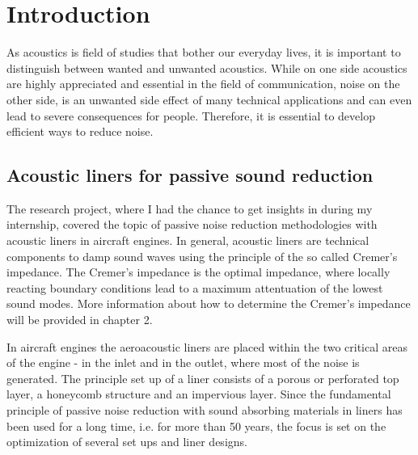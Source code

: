 \documentclass[11pt]{report} %
\begin{document}
\chapter{Introduction} 
As acoustics is field of studies that bother our everyday lives, it is important to distinguish between wanted and unwanted acoustics.
While on one side acoustics are highly appreciated and essential in the field of communication, noise on the other side, is an unwanted side effect of many technical applications and can even lead to severe consequences for people.
Therefore, it is essential to develop efficient ways to reduce noise.

\section{Acoustic liners for passive sound reduction}
The research project, where I had the chance to get insights in during my internship, covered the topic of passive noise reduction methodologies with acoustic liners in aircraft engines.
In general, acoustic liners are technical components to damp sound waves using the principle of the so called Cremer's impedance. 
The Cremer's impedance is the optimal impedance, where locally reacting boundary conditions lead to a maximum attentuation of the lowest sound modes. \cite{Abom} 
More information about how to determine the Cremer's impedance will be provided in chapter 2.   

In aircraft engines the aeroacoustic liners are placed within the two critical areas of the engine - in the inlet and in the outlet, where most of the noise is generated. 	 
The principle set up of a liner consists of a porous or perforated top layer, a honeycomb structure and an impervious layer. 
Since the fundamental principle of passive noise reduction with sound absorbing materials in liners has been used for a long time, i.e. for more than 50 years, the focus is set on the optimization of several set ups and liner designs.
\end{document}
